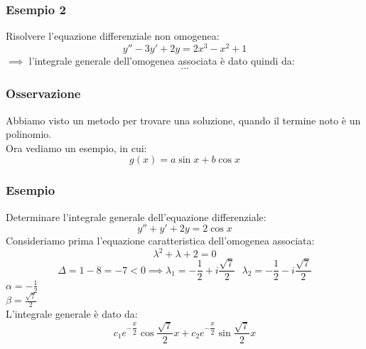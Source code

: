 \documentclass[../main.tex]{subfiles}
\begin{document}
\subsubsection{Esempio 2}
Risolvere l'equazione differenziale non omogenea:
\[
    y'' - 3y' + 2y = 2x^3 - x^2 + 1
\]
$\implies$ l'integrale generale dell'omogenea associata è dato quindi da:
\[
    \ldots
\]

\subsubsection{Osservazione}
Abbiamo visto un metodo per trovare una soluzione, quando il termine noto è un
polinomio. \\ Ora vediamo un esempio, in cui:
\[
    g(x) = a\sin{x} + b\cos{x}
\]
\subsubsection{Esempio}
Determinare l'integrale generale dell'equazione differenziale:
\[
    y'' + y' + 2y = 2\cos{x}
\]
Consideriamo prima l'equazione caratteristica dell'omogenea associata:
\[
    \lambda^2 + \lambda + 2 = 0
\]
\[
    \Delta = 1 - 8 = -7 < 0 \implies \lambda_1 = -\frac{1}{2} + i\frac{\sqrt{7}}{2} \ \ \ \lambda_2 = -\frac{1}{2} - i\frac{\sqrt{7}}{2}
\]
$\alpha = -\frac{1}{2}$\\ $\beta = \frac{\sqrt{7}}{2}$\\
L'integrale generale è dato da:
\[
    c_1e^{-\dfrac{x}{2}}\cos{\frac{\sqrt{7}}{2}x} + c_2e^{-\dfrac{x}{2}}\sin{\frac{\sqrt{7}}{2}x}
\]
\end{document}
